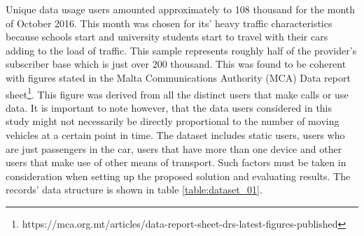\documentclass[12pt, a4paper]{report}
\theoremstyle{definition}
\theoremstyle{definition}%
\theoremstyle{definition}%
\theoremstyle{definition}%
\theoremstyle{definition}%
\theoremstyle{definition}%
\begin{document}
Unique data usage users amounted approximately to 108 thousand for the month of October 2016. This month was chosen for its' heavy traffic characteristics because schools start and university students start to travel with their cars adding to the load of traffic. This sample represents roughly half of the provider's subscriber base which is just over 200 thousand. This was found to be coherent with figures stated in the Malta Communications Authority (MCA) Data report sheet\footnote{https://mca.org.mt/articles/data-report-sheet-drs-latest-figures-published}. This figure was derived from all the distinct users that make calls or use data. It is important to note however, that the data users considered in this study might not necessarily be directly proportional to the number of moving vehicles at a certain point in time. The dataset includes static users, users who are just passengers in the car, users that have more than one device and other users that make use of other means of transport. Such factors must be taken in consideration when setting up the proposed solution and evaluating results. The records' data structure is shown in table \ref{table:dataset_01}.


\begin{table}[h] 
    \centering
\caption{Description of data fields in the mobile usage raw dataset} 
\label{table:dataset_01}
\end{table}
\end{document}
